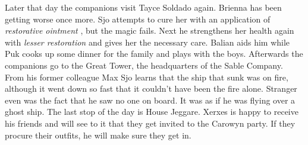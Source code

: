 Later that day the companions visit Tayce Soldado again. Brienna has been getting worse once more. Sjo attempts to cure her with an application of {\itshape restorative ointment} , but the magic fails. Next he strengthens her health again with  {\itshape lesser restoration} and gives her the necessary care. Balian aids him while Puk cooks up some dinner for the family and plays with the boys.  Afterwards the companions go to the Great Tower, the headquarters of the Sable Company. From his former colleague Max Sjo learns that the ship that sunk was on fire, although it went down so fast that it couldn't have been the fire alone. Stranger even was the fact that he saw no one on board. It was as if he was flying over a ghost ship. The last stop of the day is House Jeggare. Xerxes is happy to receive his friends and will see to it that they get invited to the Carowyn party. If they procure their outfits, he will make sure they get in. 